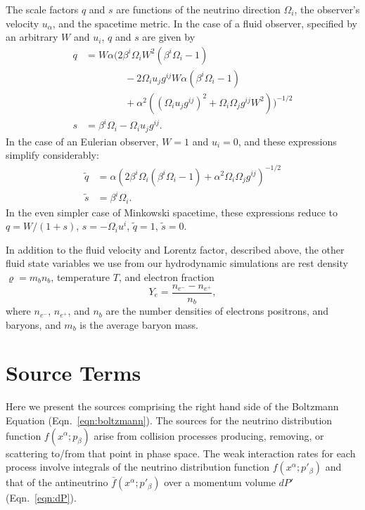 \documentclass[aps,floatfix,prd,superscriptaddress,twocolumn]{revtex4-1}
\begin{document}
The scale factors $q$ and $s$ are functions of the neutrino
direction $\Omega_i$, the observer's velocity $u_\alpha$,
and the spacetime metric.
In the case of a fluid observer, specified by an arbitrary $W$ and $u_i$,
$q$ and $s$ are given by
\begin{align}
  \label{eqn:q_general}
  q
  &= W\alpha\Bigg(2\beta^i\Omega_i W^2(\beta^i\Omega_i-1) \nonumber\\
  &\qquad\qquad - 2\Omega_i u_j g^{ij} W \alpha(\beta^i\Omega_i-1)\nonumber\\
  &\qquad\qquad + \alpha^2\left((\Omega_i u_j g^{ij})^2+\Omega_i\Omega_j g^{ij}W^2\right)\Bigg)^{-1/2}\\
  \label{eqn:s_general}
  s
  &= \beta^i\Omega_i -\Omega_i u_j g^{ij}.
\end{align}
In the case of an Eulerian observer, $W=1$ and $u_i=0$,
and these expressions simplify considerably:
\begin{align}
  \label{eqn:q_eulerian}
  \tilde{q}
  &= \alpha\left(2\beta^i\Omega_i(\beta^i\Omega_i-1)+\alpha^2\Omega_i\Omega_j g^{ij}\right)^{-1/2}\\
  \label{eqn:s_eulerian}
  \tilde{s}
  &= \beta^i\Omega_i.
\end{align}
In the even simpler case of Minkowski spacetime, these expressions
reduce to $q=W/(1+s)$, $s=-\Omega_i u^i$,
$\tilde{q}=1$, $\tilde{s}=0$.

In addition to the fluid velocity and Lorentz factor, described above, the
other fluid state variables we use from our hydrodynamic simulations
are rest density $\varrho=m_b n_b$, temperature $T$, and electron fraction
\begin{equation}
  Y_e = \frac{n_{e^-} - n_{e^+}}{n_b},
\end{equation}
where $n_{e^-}$, $n_{e^+}$, and $n_b$ are the number densities of electrons
positrons, and baryons, and $m_b$ is the average baryon mass.

\section{Source Terms}
\label{sec:source_terms}
Here we present the sources comprising the right hand side of the
Boltzmann Equation (Eqn.~\ref{eqn:boltzmann}). The sources for the neutrino
distribution function $f(x^\alpha;p_\beta)$ arise from collision processes
producing, removing, or scattering to/from that point in phase space.
The weak interaction rates for each process involve integrals of
the neutrino distribution function $f(x^\alpha;p'_\beta)$ and that of the
antineutrino $\bar{f}(x^\alpha;p'_\beta)$ over a momentum volume
$dP'$ (Eqn.~\ref{eqn:dP}).
\end{document}
